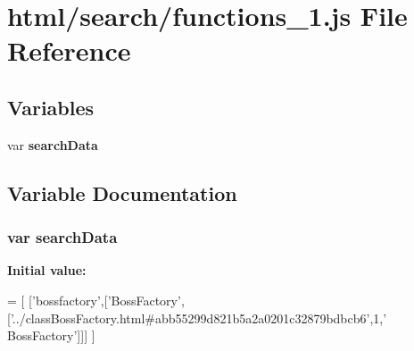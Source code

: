\section{html/search/functions\-\_\-1.js File Reference}
\label{functions__1_8js}
\subsection*{Variables}
\begin{DoxyCompactItemize}
\item 
var {\bf search\-Data}
\end{DoxyCompactItemize}


\subsection{Variable Documentation}
\subsubsection[{search\-Data}]{\setlength{\rightskip}{0pt plus 5cm}var search\-Data}\label{functions__1_8js_ad01a7523f103d6242ef9b0451861231e}
{\bfseries Initial value\-:}
\begin{DoxyCode}
=
[
  [\textcolor{stringliteral}{'bossfactory'},[\textcolor{stringliteral}{'BossFactory'},[\textcolor{stringliteral}{'../classBossFactory.html#abb55299d821b5a2a0201c32879bdbcb6'},1,\textcolor{stringliteral}{'
      BossFactory'}]]]
]
\end{DoxyCode}

